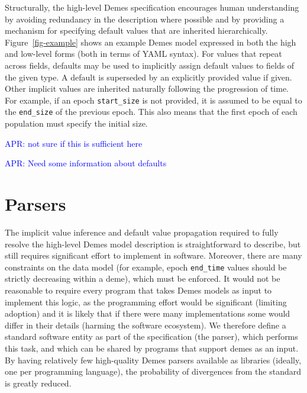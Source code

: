 \documentclass[11pt]{article}
\newcommand{\aprcomment}[1]{{\textcolor{blue}{APR: #1}}}
\begin{document}
Structurally, the high-level Demes specification encourages human understanding
by avoiding redundancy in the description where possible and by providing a
mechanism for specifying default values that are inherited hierarchically.
Figure~\ref{fig-example} shows an example Demes model expressed in both the
high and low-level forms (both in terms of YAML syntax). For values that repeat
across fields, defaults may be used to implicitly assign default values to
fields of the given type.  A default is superseded by an explicitly provided
value if given. Other implicit values are inherited naturally following the
progression of time. For example, if an epoch \texttt{start\_size} is not
provided, it is assumed to be equal to the \texttt{end\_size} of the previous
epoch. This also means that the first epoch of each population must specify the
initial size.

\aprcomment{not sure if this is sufficient here}

\aprcomment{Need some information about defaults}

\section{Parsers}\label{sec:appendix-parsers}

The implicit value inference and default value propagation required to
fully resolve the high-level Demes model description is straightforward
to describe, but still requires significant effort to implement in
software. Moreover, there are many constraints on the data model
(for example, epoch \texttt{end\_time} values should be strictly decreasing
within a deme), which must be enforced.
It would not be reasonable to require every program that
takes Demes models as input to implement this logic, as the programming
effort would be significant (limiting adoption)
and it is likely that if there were many implementations some would differ
in their details (harming the software ecosystem).
We therefore define
a standard software entity as part of the specification (the parser),
which performs this task, and which can be shared by programs that
support demes as an input. By having relatively few high-quality Demes
parsers available as libraries (ideally, one per programming language),
the probability of divergences from the standard is greatly reduced.
\end{document}
